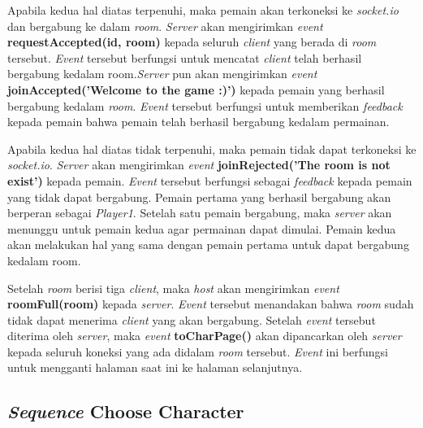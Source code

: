 Apabila kedua hal diatas terpenuhi, maka pemain akan terkoneksi ke \textit{socket.io} dan bergabung ke dalam \textit{room}. \textit{Server} akan mengirimkan \textit{event} \textbf{requestAccepted(id, room)} kepada seluruh \textit{client} yang berada di \textit{room} tersebut. \textit{Event} tersebut berfungsi untuk mencatat \textit{client} telah berhasil bergabung kedalam room.\textit{Server} pun akan mengirimkan \textit{event} \textbf{joinAccepted('Welcome to the game :)')} kepada pemain yang berhasil bergabung kedalam \textit{room}. \textit{Event} tersebut berfungsi untuk memberikan \textit{feedback} kepada pemain bahwa pemain telah berhasil bergabung kedalam permainan.

Apabila kedua hal diatas tidak terpenuhi, maka pemain tidak dapat terkoneksi ke \textit{socket.io}. \textit{Server} akan mengirimkan \textit{event} \textbf{joinRejected('The room is not exist')} kepada pemain. \textit{Event} tersebut berfungsi sebagai \textit{feedback} kepada pemain yang tidak dapat bergabung. Pemain pertama yang berhasil bergabung akan berperan sebagai \textit{Player1}. Setelah satu pemain bergabung, maka \textit{server} akan menunggu untuk pemain kedua agar permainan dapat dimulai. Pemain kedua akan melakukan hal yang sama dengan pemain pertama untuk dapat bergabung kedalam room.

Setelah \textit{room} berisi tiga \textit{client}, maka \textit{host} akan mengirimkan \textit{event} \textbf{roomFull(room)} kepada \textit{server}. \textit{Event} tersebut menandakan bahwa \textit{room} sudah tidak dapat menerima \textit{client} yang akan bergabung. Setelah \textit{event} tersebut diterima oleh \textit{server}, maka \textit{event} \textbf{toCharPage()} akan dipancarkan oleh \textit{server} kepada seluruh koneksi yang ada didalam \textit{room} tersebut. \textit{Event} ini berfungsi untuk mengganti halaman saat ini ke halaman selanjutnya.

\subsection{\textit{Sequence} Choose Character}

